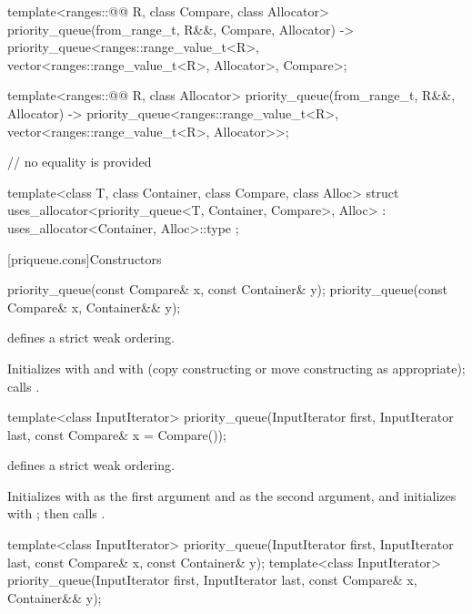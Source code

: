 \begin{codeblock}
{  template<ranges::@@ R, class Compare, class Allocator>
    priority_queue(from_range_t, R&&, Compare, Allocator)
      -> priority_queue<ranges::range_value_t<R>, vector<ranges::range_value_t<R>, Allocator>,
                        Compare>;

  template<ranges::@@ R, class Allocator>
    priority_queue(from_range_t, R&&, Allocator)
      -> priority_queue<ranges::range_value_t<R>, vector<ranges::range_value_t<R>, Allocator>>;

  // no equality is provided

  template<class T, class Container, class Compare, class Alloc>
    struct uses_allocator<priority_queue<T, Container, Compare>, Alloc>
      : uses_allocator<Container, Alloc>::type { };
}
\end{codeblock}

[priqueue.cons]{Constructors}

%
\begin{itemdecl}
priority_queue(const Compare& x, const Container& y);
priority_queue(const Compare& x, Container&& y);
\end{itemdecl}

\begin{itemdescr}
\pnum
\expects
{} defines a strict weak ordering.

\pnum
\effects
Initializes
 with
 and
 with
 (copy constructing or move constructing as appropriate);
calls
.
\end{itemdescr}

%
\begin{itemdecl}
template<class InputIterator>
  priority_queue(InputIterator first, InputIterator last, const Compare& x = Compare());
\end{itemdecl}

\begin{itemdescr}
\pnum
\expects
{} defines a strict weak ordering.

\pnum
\effects
Initializes  with
 as the first argument and
 as the second argument, and
initializes  with ;
then calls .
\end{itemdescr}

%
\begin{itemdecl}
template<class InputIterator>
  priority_queue(InputIterator first, InputIterator last, const Compare& x, const Container& y);
template<class InputIterator>
  priority_queue(InputIterator first, InputIterator last, const Compare& x, Container&& y);
\end{itemdecl}

